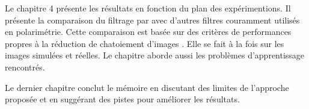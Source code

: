 Le chapitre 4 présente les résultats en fonction du plan des expérimentions.  Il présente la comparaison du filtrage par \acrconvnet avec d'autres filtres couramment utilisés en polarimétrie.  Cette comparaison est basée sur des critères de performances propres à la réduction de chatoiement d’images \acrpolsarns.  Elle se fait à la fois sur les images simulées et réelles.  Le chapitre aborde aussi les problèmes d'apprentissage rencontrés.  

Le dernier chapitre conclut le mémoire en discutant des limites de l'approche proposée et en suggérant des pistes pour améliorer les résultats.



